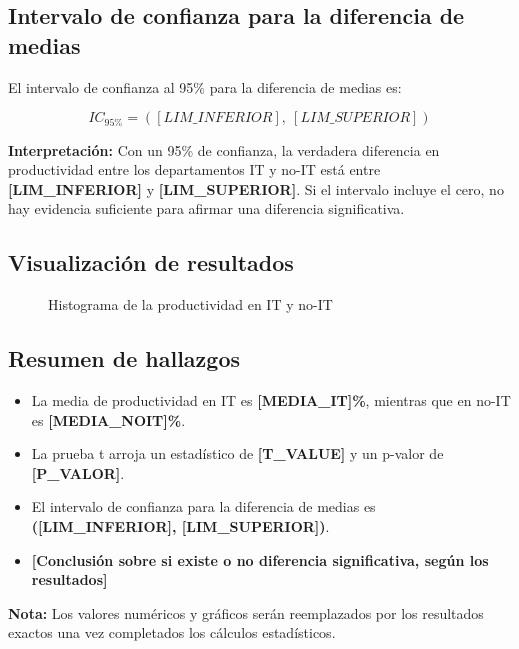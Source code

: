 \subsection{Intervalo de confianza para la diferencia de medias}

El intervalo de confianza al 95\% para la diferencia de medias es:

\[
IC_{95\%} = ([LIM\_INFERIOR],\ [LIM\_SUPERIOR])
\]

\noindent
\textbf{Interpretación:} Con un 95\% de confianza, la verdadera diferencia en productividad entre los departamentos IT y no-IT está entre \textbf{[LIM\_INFERIOR]} y \textbf{[LIM\_SUPERIOR]}. Si el intervalo incluye el cero, no hay evidencia suficiente para afirmar una diferencia significativa.

\subsection{Visualización de resultados}

\begin{figure}[H]
    \centering
    \caption{Histograma de la productividad en IT y no-IT}
\end{figure}

\subsection{Resumen de hallazgos}

\begin{itemize}
    \item La media de productividad en IT es \textbf{[MEDIA\_IT]\%}, mientras que en no-IT es \textbf{[MEDIA\_NOIT]\%}.
    \item La prueba t arroja un estadístico de \textbf{[T\_VALUE]} y un p-valor de \textbf{[P\_VALOR]}.
    \item El intervalo de confianza para la diferencia de medias es \textbf{([LIM\_INFERIOR], [LIM\_SUPERIOR])}.
    \item \textbf{[Conclusión sobre si existe o no diferencia significativa, según los resultados]}
\end{itemize}

\vspace{0.5cm}
\noindent
\textbf{Nota:} Los valores numéricos y gráficos serán reemplazados por los resultados exactos una vez completados los cálculos estadísticos.



